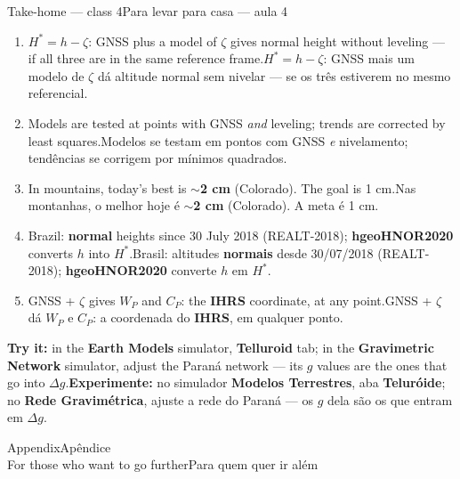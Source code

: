 \documentclass[aspectratio=169,11pt]{beamer}
\newcommand{\tr}[2]{\ifEN#2\else#1\fi}
\newcommand{\bnum}[1]{\textbf{\textcolor{mTeal}{#1}}}
\begin{document}
\begin{frame}{\tr{Para levar para casa --- aula 4}{Take-home --- class 4}}
  \small
  \begin{enumerate}
    \setlength{\itemsep}{2pt}
    \item \tr{\bnum{$H^{*} = h - \zeta$}: GNSS mais um modelo de $\zeta$ dá altitude normal sem
          nivelar --- se os três estiverem no mesmo referencial.}{\bnum{$H^{*} = h - \zeta$}:
          GNSS plus a model of $\zeta$ gives normal height without leveling --- if all three
          are in the same reference frame.}
    \item \tr{Modelos se testam em pontos com GNSS \emph{e} nivelamento; tendências se corrigem
          por mínimos quadrados.}{Models are tested at points with GNSS \emph{and} leveling;
          trends are corrected by least squares.}
    \item \tr{Nas montanhas, o melhor hoje é \bnum{$\sim$2 cm} (Colorado). A meta é 1
          cm.}{In mountains, today's best is \bnum{$\sim$2 cm} (Colorado). The goal is 1 cm.}
    \item \tr{Brasil: altitudes \bnum{normais} desde 30/07/2018 (REALT-2018);
          \textbf{hgeoHNOR2020} converte $h$ em $H^{*}$.}{Brazil: \bnum{normal} heights since
          30 July 2018 (REALT-2018); \textbf{hgeoHNOR2020} converts $h$ into $H^{*}$.}
    \item \tr{GNSS + $\zeta$ dá $W_P$ e $C_P$: a coordenada do \bnum{IHRS}, em qualquer
          ponto.}{GNSS + $\zeta$ gives $W_P$ and $C_P$: the \bnum{IHRS} coordinate, at any
          point.}
  \end{enumerate}
  \begin{ideia}
    \scriptsize \tr{\textbf{Experimente:} no simulador \textbf{Modelos Terrestres}, aba
    \textbf{Teluróide}; no \textbf{Rede Gravimétrica}, ajuste a rede do Paraná --- os $g$ dela
    são os que entram em $\Delta g$.}{\textbf{Try it:} in the \textbf{Earth Models}
    simulator, \textbf{Telluroid} tab; in the \textbf{Gravimetric Network} simulator, adjust
    the Paraná network --- its $g$ values are the ones that go into $\Delta g$.}
  \end{ideia}
\end{frame}

\appendix

\begin{frame}[standout]
  \tr{Apêndice}{Appendix}\\[6pt]
  {\normalsize \tr{Para quem quer ir além}{For those who want to go further}}
\end{frame}
\end{document}
